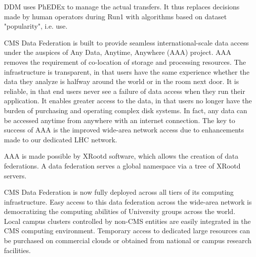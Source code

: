 \documentclass[11pt,a4paper]{article}
\begin{document}
DDM uses PhEDEx to manage the actual transfers. It thus replaces decisions made by human operators during 
Run1 with algorithms based on dataset "popularity", i.e. use.


CMS Data Federation is built to provide seamless international-scale data
access  under the auspices of Any Data, Anytime, Anywhere
(AAA) project. AAA removes the requirement of co-location of storage and
processing resources.  The infrastructure is transparent, in that
users have the same experience whether the data they analyze is
halfway around the world or in the room next door.  It is reliable, in
that end users never see a failure of data access when they run their
application.  It enables greater access to the data, in that users no
longer have the burden of purchasing and operating complex disk
systems. In fact, any data can be accessed anytime from anywhere with
an internet connection. The key to success of AAA is the improved
wide-area network access due to enhancements made to our dedicated LHC
network.

AAA is made possible by XRootd software, which allows the creation of
data federations. A data federation serves a global namespace via a
tree of XRootd servers. 

CMS Data Federation is now fully deployed across all tiers of its
computing infrastructure. Easy access to this data federation across
the wide-area network is democratizing the computing abilities of
University groups across the world. Local campus clusters controlled by
non-CMS entities are easily integrated in the CMS computing
environment. Temporary access to dedicated large resources can be
purchased on commercial clouds or obtained from national or campus
research facilities.
\end{document}
